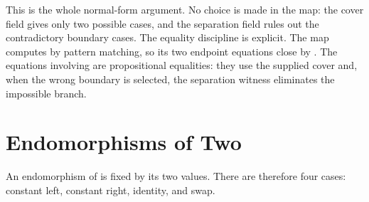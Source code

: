 \documentclass[11pt]{article}
\begin{document}
This is the whole normal-form argument.  No choice is made in the map:
the cover field gives only two possible cases, and the separation field
rules out the contradictory boundary cases.  The equality discipline is
explicit.  The map  computes by pattern matching,
so its two endpoint equations close by .
The equations involving  are propositional
equalities: they use the supplied cover and, when the wrong boundary is
selected, the separation witness eliminates the impossible branch.

\section{Endomorphisms of Two}

An endomorphism of  is fixed by its two values.  There
are therefore four cases: constant left, constant right, identity, and
swap.

\begin{center}
\end{center}
\end{document}
